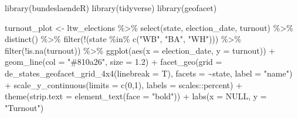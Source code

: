 \documentclass[
]{scrartcl}
\newenvironment{Shaded}{\begin{snugshade}}{\end{snugshade}}
\newcommand{\AttributeTok}[1]{\textcolor[rgb]{0.77,0.63,0.00}{#1}}
\newcommand{\ConstantTok}[1]{\textcolor[rgb]{0.00,0.00,0.00}{#1}}
\newcommand{\DecValTok}[1]{\textcolor[rgb]{0.00,0.00,0.81}{#1}}
\newcommand{\FloatTok}[1]{\textcolor[rgb]{0.00,0.00,0.81}{#1}}
\newcommand{\FunctionTok}[1]{\textcolor[rgb]{0.00,0.00,0.00}{#1}}
\newcommand{\NormalTok}[1]{#1}
\newcommand{\OtherTok}[1]{\textcolor[rgb]{0.56,0.35,0.01}{#1}}
\newcommand{\SpecialCharTok}[1]{\textcolor[rgb]{0.00,0.00,0.00}{#1}}
\newcommand{\StringTok}[1]{\textcolor[rgb]{0.31,0.60,0.02}{#1}}
\begin{document}
\begin{Shaded}
\begin{Highlighting}[]
\FunctionTok{library}\NormalTok{(bundeslaendeR)}
\FunctionTok{library}\NormalTok{(tidyverse)}
\FunctionTok{library}\NormalTok{(geofacet)}

\NormalTok{turnout\_plot }\OtherTok{\textless{}{-}}
\NormalTok{ltw\_elections }\SpecialCharTok{\%\textgreater{}\%} 
  \FunctionTok{select}\NormalTok{(state, election\_date, turnout) }\SpecialCharTok{\%\textgreater{}\%} 
  \FunctionTok{distinct}\NormalTok{() }\SpecialCharTok{\%\textgreater{}\%} 
  \FunctionTok{filter}\NormalTok{(}\SpecialCharTok{!}\NormalTok{(state }\SpecialCharTok{\%in\%} \FunctionTok{c}\NormalTok{(}\StringTok{"WB"}\NormalTok{, }\StringTok{"BA"}\NormalTok{, }\StringTok{"WH"}\NormalTok{))) }\SpecialCharTok{\%\textgreater{}\%} 
  \FunctionTok{filter}\NormalTok{(}\SpecialCharTok{!}\FunctionTok{is.na}\NormalTok{(turnout)) }\SpecialCharTok{\%\textgreater{}\%} 
  \FunctionTok{ggplot}\NormalTok{(}\FunctionTok{aes}\NormalTok{(}\AttributeTok{x =}\NormalTok{ election\_date, }\AttributeTok{y =}\NormalTok{ turnout)) }\SpecialCharTok{+}
    \FunctionTok{geom\_line}\NormalTok{(}\AttributeTok{col =} \StringTok{"\#810a26"}\NormalTok{, }\AttributeTok{size =} \FloatTok{1.2}\NormalTok{) }\SpecialCharTok{+}
    \FunctionTok{facet\_geo}\NormalTok{(}\AttributeTok{grid =} \FunctionTok{de\_states\_geofacet\_grid\_4x4}\NormalTok{(}\AttributeTok{linebreak =}\NormalTok{ T),}
              \AttributeTok{facets =} \SpecialCharTok{\textasciitilde{}}\NormalTok{state, }\AttributeTok{label =} \StringTok{"name"}\NormalTok{) }\SpecialCharTok{+}
    \FunctionTok{scale\_y\_continuous}\NormalTok{(}\AttributeTok{limits =} \FunctionTok{c}\NormalTok{(}\DecValTok{0}\NormalTok{,}\DecValTok{1}\NormalTok{),}
                       \AttributeTok{labels =}\NormalTok{ scales}\SpecialCharTok{::}\NormalTok{percent) }\SpecialCharTok{+}
    \FunctionTok{theme}\NormalTok{(}\AttributeTok{strip.text =} \FunctionTok{element\_text}\NormalTok{(}\AttributeTok{face =} \StringTok{"bold"}\NormalTok{)) }\SpecialCharTok{+}
    \FunctionTok{labs}\NormalTok{(}\AttributeTok{x =} \ConstantTok{NULL}\NormalTok{, }\AttributeTok{y =} \StringTok{"Turnout"}\NormalTok{)}
\end{Highlighting}
\end{Shaded}

\nocite{runfolaGeoBoundariesGlobalDatabase2020}

\newpage
\end{document}
